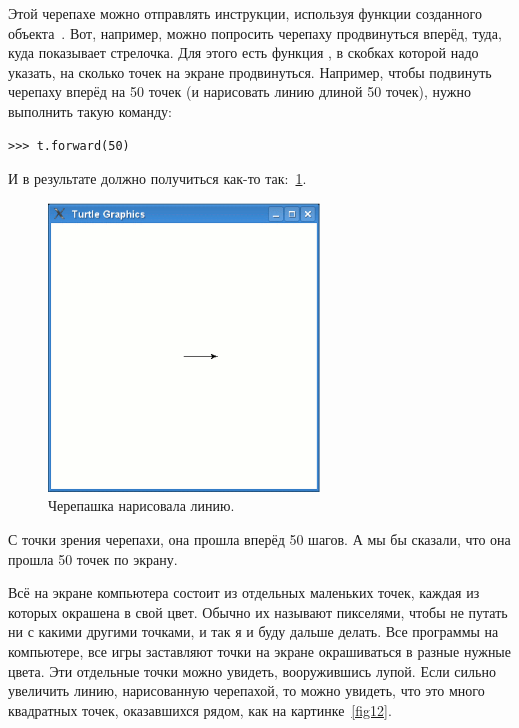 
Этой черепахе можно отправлять инструкции, используя функции созданного объекта . Вот, например, можно попросить черепаху продвинуться вперёд, туда, куда показывает стрелочка. Для этого есть функция , в скобках которой надо указать, на сколько точек на экране продвинуться. Например, чтобы подвинуть черепаху вперёд на 50 точек (и нарисовать линию длиной 50 точек), нужно выполнить такую команду:

\begin{listing}
\begin{verbatim}
>>> t.forward(50)
\end{verbatim}
\end{listing}

И в результате должно получиться как-то так:~\ref{fig11}.

\begin{figure}
\begin{center}
\includegraphics[width=72mm]{../en/figure11.eps}
\end{center}
\caption{Черепашка нарисовала линию.}\label{fig11}
\end{figure}

С точки зрения черепахи, она прошла вперёд 50 шагов. А мы бы сказали, что она прошла 50 точек по экрану.


Всё на экране компьютера состоит из отдельных маленьких точек, каждая из которых окрашена в свой цвет. Обычно их называют пикселями, чтобы не путать ни с какими другими точками, и так я и буду дальше делать. Все программы на компьютере, все игры заставляют точки на экране окрашиваться в разные нужные цвета. Эти отдельные точки можно увидеть, вооружившись лупой. Если сильно увеличить линию, нарисованную черепахой, то можно увидеть, что это много квадратных точек, оказавшихся рядом, как на картинке \ref{fig12}.

